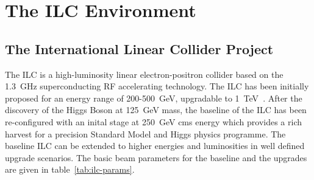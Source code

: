 \chapter{The ILC Environment}



\vspace{2cm}
\section{The International Linear Collider Project}
The ILC is a high-luminosity linear electron-positron collider based on the 1.3~GHz superconducting RF accelerating technology. The ILC has been initially proposed for an energy range of 200-500~GeV, upgradable to 1~TeV~\cite{Behnke:2013xla}. After the discovery of the Higgs Boson at 125~GeV mass, the baseline of the ILC has been re-configured with an inital stage at 250~GeV cms energy which provides a rich harvest for a precision Standard Model and Higgs physics programme. The baseline ILC can be extended to higher energies and luminosities in well defined upgrade scenarios. The basic beam parameters for the baseline and the upgrades are given in table~\ref{tab:ilc-params}.

